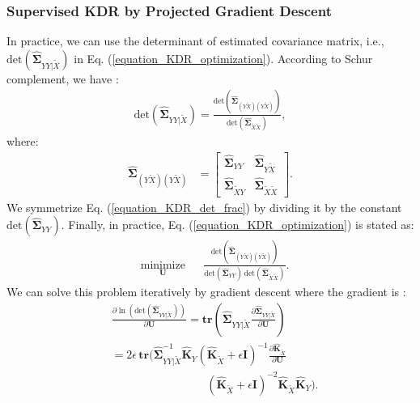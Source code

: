\documentclass[lang=cn,10pt]{gorgeousnbook}
\numberwithin{equation}{section}%
\numberwithin{figure}{section}%
\begin{document}
\subsubsection{Supervised KDR by Projected Gradient Descent}

In practice, we can use the determinant of estimated covariance matrix, i.e., $\text{det}(\widehat{\boldsymbol{\Sigma}}_{YY|\widetilde{X}})$ in Eq. (\ref{equation_KDR_optimization}). 
According to Schur complement, we have \cite{fukumizu2003kernel}:
\begin{align}\label{equation_KDR_det_frac}
\text{det}(\widehat{\boldsymbol{\Sigma}}_{YY|\widetilde{X}}) = \frac{\text{det}(\widehat{\boldsymbol{\Sigma}}_{(Y\widetilde{X})(Y\widetilde{X})})}{\text{det}(\widehat{\boldsymbol{\Sigma}}_{\widetilde{X}\widetilde{X}})},
\end{align}
where:
\begin{align*}
\widehat{\boldsymbol{\Sigma}}_{(Y\widetilde{X})(Y\widetilde{X})} &= 
\begin{bmatrix}
\widehat{\boldsymbol{\Sigma}}_{YY} & \widehat{\boldsymbol{\Sigma}}_{Y\widetilde{X}} \\
\widehat{\boldsymbol{\Sigma}}_{\widetilde{X}Y} & \widehat{\boldsymbol{\Sigma}}_{\widetilde{X}\widetilde{X}}
\end{bmatrix}.
\end{align*}
We symmetrize Eq. (\ref{equation_KDR_det_frac}) by dividing it by the constant $\text{det}(\widehat{\boldsymbol{\Sigma}}_{YY})$. Finally, in practice, Eq. (\ref{equation_KDR_optimization}) is stated as:
\begin{equation}\label{equation_KDR_optimization_practice}
\begin{aligned}
& \underset{\boldsymbol{U}}{\text{minimize}} 
& & \frac{\text{det}(\widehat{\boldsymbol{\Sigma}}_{(Y\widetilde{X})(Y\widetilde{X})})}{\text{det}(\widehat{\boldsymbol{\Sigma}}_{YY})\, \text{det}(\widehat{\boldsymbol{\Sigma}}_{\widetilde{X}\widetilde{X}})}.
\end{aligned}
\end{equation}
We can solve this problem iteratively by gradient descent \cite{ghojogh2021kkt} where the gradient is \cite{fukumizu2004dimensionality}:
\begin{align*}
&\frac{\partial \ln (\text{det}(\widehat{\boldsymbol{\Sigma}}_{YY|\widetilde{X}}))}{\partial \boldsymbol{U}} = \textbf{tr}(\widehat{\boldsymbol{\Sigma}}_{YY|\widetilde{X}} \frac{\partial \widehat{\boldsymbol{\Sigma}}_{YY|\widetilde{X}}}{\partial \boldsymbol{U}}) \\
&= 2\epsilon\, \textbf{tr}\Big(\widehat{\boldsymbol{\Sigma}}_{YY|\widetilde{X}}^{-1} \widehat{\boldsymbol{K}}_Y (\widehat{\boldsymbol{K}}_{\widetilde{X}} + \epsilon \boldsymbol{I})^{-1} \frac{\partial \widehat{\boldsymbol{K}}_{\widetilde{X}}}{\partial \boldsymbol{U}} \\
&~~~~~~~~~~~~~~~~~~~~~~~~~~~~~~~~~~~~~~(\widehat{\boldsymbol{K}}_{\widetilde{X}} + \epsilon \boldsymbol{I})^{-2} \widehat{\boldsymbol{K}}_{\widetilde{X}} \widehat{\boldsymbol{K}}_Y\Big).
\end{align*}
\end{document}

